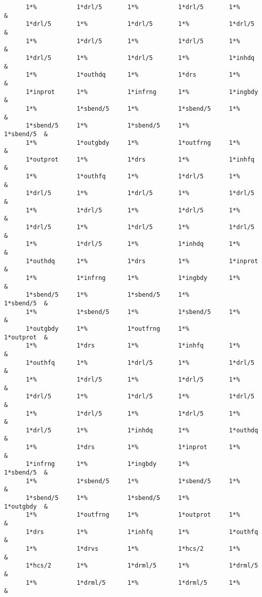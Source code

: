 \begin{footnotesize}
\begin{verbatim}
      1*%           1*drl/5       1*%           1*drl/5       1*%        &
      1*drl/5       1*%           1*drl/5       1*%           1*drl/5    &
      1*%           1*drl/5       1*%           1*drl/5       1*%        &
      1*drl/5       1*%           1*drl/5       1*%           1*inhdq    &
      1*%           1*outhdq      1*%           1*drs         1*%        &
      1*inprot      1*%           1*infrng      1*%           1*ingbdy   &
      1*%           1*sbend/5     1*%           1*sbend/5     1*%        &
      1*sbend/5     1*%           1*sbend/5     1*%           1*sbend/5  &
      1*%           1*outgbdy     1*%           1*outfrng     1*%        &
      1*outprot     1*%           1*drs         1*%           1*inhfq    &
      1*%           1*outhfq      1*%           1*drl/5       1*%        &
      1*drl/5       1*%           1*drl/5       1*%           1*drl/5    &
      1*%           1*drl/5       1*%           1*drl/5       1*%        &
      1*drl/5       1*%           1*drl/5       1*%           1*drl/5    &
      1*%           1*drl/5       1*%           1*inhdq       1*%        &
      1*outhdq      1*%           1*drs         1*%           1*inprot   &
      1*%           1*infrng      1*%           1*ingbdy      1*%        &
      1*sbend/5     1*%           1*sbend/5     1*%           1*sbend/5  &
      1*%           1*sbend/5     1*%           1*sbend/5     1*%        &
      1*outgbdy     1*%           1*outfrng     1*%           1*outprot  &
      1*%           1*drs         1*%           1*inhfq       1*%        &
      1*outhfq      1*%           1*drl/5       1*%           1*drl/5    &
      1*%           1*drl/5       1*%           1*drl/5       1*%        &
      1*drl/5       1*%           1*drl/5       1*%           1*drl/5    &
      1*%           1*drl/5       1*%           1*drl/5       1*%        &
      1*drl/5       1*%           1*inhdq       1*%           1*outhdq   &
      1*%           1*drs         1*%           1*inprot      1*%        &
      1*infrng      1*%           1*ingbdy      1*%           1*sbend/5  &
      1*%           1*sbend/5     1*%           1*sbend/5     1*%        &
      1*sbend/5     1*%           1*sbend/5     1*%           1*outgbdy  &
      1*%           1*outfrng     1*%           1*outprot     1*%        &
      1*drs         1*%           1*inhfq       1*%           1*outhfq   &
      1*%           1*drvs        1*%           1*hcs/2       1*%        &
      1*hcs/2       1*%           1*drml/5      1*%           1*drml/5   &
      1*%           1*drml/5      1*%           1*drml/5      1*%        &

\end{verbatim}
\end{footnotesize}
